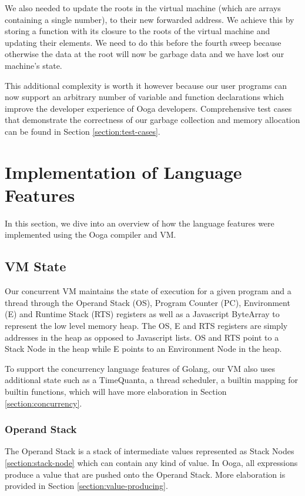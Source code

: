 \documentclass{report}
\begin{document}
We also needed to update the roots in the virtual machine (which are arrays containing a single number), to their new forwarded address. We achieve this by storing a function with its closure to the roots of the virtual machine and updating their elements. We need to do this before the fourth sweep because otherwise the data at the root will now be garbage data and we have lost our machine's state.

This additional complexity is worth it however because our user programs can now support an arbitrary number of variable and function declarations which improve the developer experience of Ooga developers. Comprehensive test cases that demonstrate the correctness of our garbage collection and memory allocation can be found in Section \ref{section:test-cases}.

\section{Implementation of Language Features}

In this section, we dive into an overview of how the language features were implemented using the Ooga compiler and VM.

\subsection{VM State}

Our concurrent VM maintains the state of execution for a given program and a thread through the Operand Stack (OS), Program Counter (PC), Environment (E) and Runtime Stack (RTS) registers as well as a Javascript ByteArray to represent the low level memory heap. The OS, E and RTS registers are simply addresses in the heap as opposed to Javascript lists. OS and RTS point to a Stack Node in the heap while E points to an Environment Node in the heap.

To support the concurrency language features of Golang, our VM also uses additional state such as a TimeQuanta, a thread scheduler, a builtin mapping for builtin functions, which will have more elaboration in Section \ref{section:concurrency}.

\subsubsection{Operand Stack}

The Operand Stack is a stack of intermediate values represented as Stack Nodes \ref{section:stack-node} which can contain any kind of value. In Ooga, all expressions produce a value that are pushed onto the Operand Stack. More elaboration is provided in Section \ref{section:value-producing}.
\end{document}
